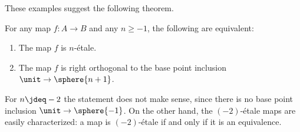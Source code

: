 \documentclass{msc}
\begin{document}
These examples suggest the following theorem.

\begin{thm}
  \label{thm:char_n_etale}
  For any map $f:A\to B$ and any $n\geq -1$, the following are equivalent:
  \begin{enumerate}
  \item The map $f$ is $n$-\'etale.
  \item The map $f$ is right orthogonal to the base point inclusion $\unit\to\sphere{n+1}$.
  \end{enumerate}
\end{thm}

\begin{rmk}
  For $n\jdeq -2$ the statement does not make sense, since there is no base point inclusion $\unit\to\sphere{-1}$. On the other hand, the $(-2)$-\'etale maps are easily characterized: a map is $(-2)$-\'etale if and only if it is an equivalence.
\end{rmk}
\end{document}

